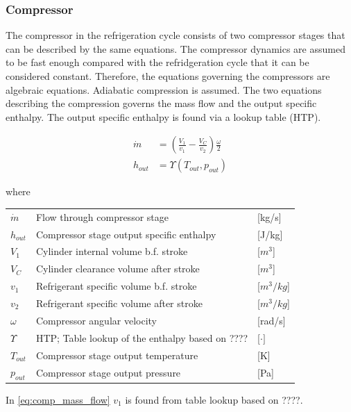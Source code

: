 \subsubsection{Compressor}
The compressor in the refrigeration cycle consists of two compressor stages that can be described by the same equations.
The compressor dynamics are assumed to be fast enough compared with the refridgeration cycle that it can be considered constant. Therefore, the equations governing the compressors are algebraic equations. 
Adiabatic compression is assumed. 
The two equations describing the compression governs the mass flow and the output specific enthalpy. The output specific enthalpy is found via a lookup table (HTP). 

\begin{align}
	\dot{m} &= \left(\frac{V_1}{v_1} - \frac{V_C}{v_2}\right) \frac{\omega}{2} \\ \label{eq:comp_mass_flow}
	h_{out} &= \Upsilon(T_{out}, p_{out}) 
\end{align}

where

\begin{center}
	\begin{tabular}{l p{8cm} l}
		$\dot{m}$				& Flow through compressor stage					& [\si{kg}/\si{s}] \\ 
		$h_{out}$				& Compressor stage output specific enthalpy				& [\si{J}/\si{kg}] \\ 
		$V_1$					& Cylinder internal volume b.f. stroke			& [$\si{m}^3$] \\ 
		$V_C$					& Cylinder clearance volume after stroke		& [$\si{m}^3$] \\ 
		$v_1$					& Refrigerant specific volume b.f. stroke		& [$\si{m}^3/\si{kg}$] \\
		$v_2$					& Refrigerant specific volume after stroke		& [$\si{m}^3/\si{kg}$] \\
		$\omega$ 				& Compressor angular velocity 					& [\si{rad}/\si{s}]\\
		$\Upsilon$ 				& HTP; Table lookup of the enthalpy based on ???? 			& [$\cdot]$ \\
		$T_{out}$ 				& Compressor stage output temperature 			& [\si{K}] \\
		$p_{out}$				& Compressor stage output pressure 				& [\si{Pa}]
	\end{tabular}
\end{center}

In \cref{eq:comp_mass_flow} $v_1$ is found from table lookup based on ????.

